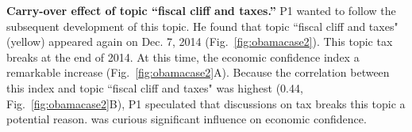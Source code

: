 \noindent \textbf{\normalsize Carry-over effect of topic ``fiscal cliff and taxes.''}
P1 wanted to follow the subsequent development of this topic.
He found that  topic ``fiscal cliff and taxes" (yellow) appeared again on Dec. 7, 2014 (Fig.~\ref{fig:obamacase2}).
This topic  tax breaks at the end of 2014. %
At this time, the economic confidence index  a remarkable increase (Fig.~\ref{fig:obamacase2}A).
Because the correlation between this index and  topic ``fiscal cliff and taxes" was  highest (0.44, Fig.~\ref{fig:obamacase2}B), P1 speculated that  discussions on tax breaks  this topic  a potential reason.
 was curious  significant influence  on economic confidence.
